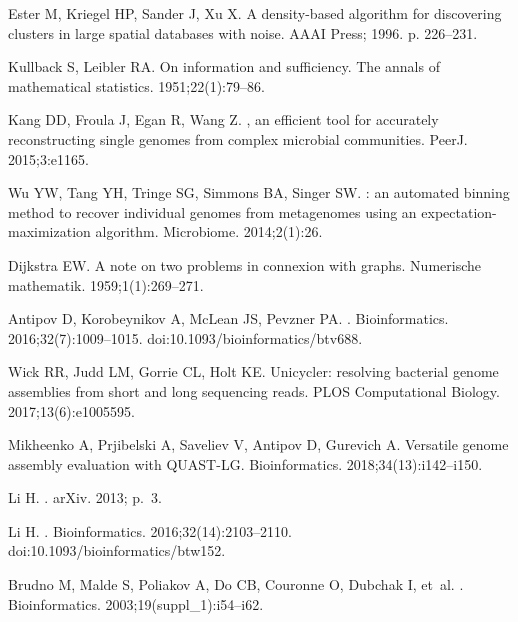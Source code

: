 \documentclass[10pt,letterpaper]{article}
\begin{document}
\begin{thebibliography}{10}
Ester M, Kriegel HP, Sander J, Xu X.
\newblock A density-based algorithm for discovering clusters in large spatial
  databases with noise.
\newblock AAAI Press; 1996. p. 226--231.

Kullback S, Leibler RA.
\newblock On information and sufficiency.
\newblock The annals of mathematical statistics. 1951;22(1):79--86.

Kang DD, Froula J, Egan R, Wang Z.
, an efficient tool for accurately reconstructing single
  genomes from complex microbial communities.
\newblock PeerJ. 2015;3:e1165.

Wu YW, Tang YH, Tringe SG, Simmons BA, Singer SW.
: an automated binning method to recover individual genomes
  from metagenomes using an expectation-maximization algorithm.
\newblock Microbiome. 2014;2(1):26.

Dijkstra EW.
\newblock A note on two problems in connexion with graphs.
\newblock Numerische mathematik. 1959;1(1):269--271.

Antipov D, Korobeynikov A, McLean JS, Pevzner PA.
.
\newblock Bioinformatics. 2016;32(7):1009--1015.
\newblock doi:{10.1093/bioinformatics/btv688}.

Wick RR, Judd LM, Gorrie CL, Holt KE.
\newblock Unicycler: resolving bacterial genome assemblies from short and long
  sequencing reads.
\newblock PLOS Computational Biology. 2017;13(6):e1005595.

Mikheenko A, Prjibelski A, Saveliev V, Antipov D, Gurevich A.
\newblock Versatile genome assembly evaluation with {QUAST-LG}.
\newblock Bioinformatics. 2018;34(13):i142--i150.

Li H.
.
\newblock arXiv. 2013; p.~3.

Li H.
.
\newblock Bioinformatics. 2016;32(14):2103--2110.
\newblock doi:{10.1093/bioinformatics/btw152}.

Brudno M, Malde S, Poliakov A, Do CB, Couronne O, Dubchak I, et~al.
.
\newblock Bioinformatics. 2003;19(suppl\_1):i54--i62.


\end{thebibliography}
\end{document}
